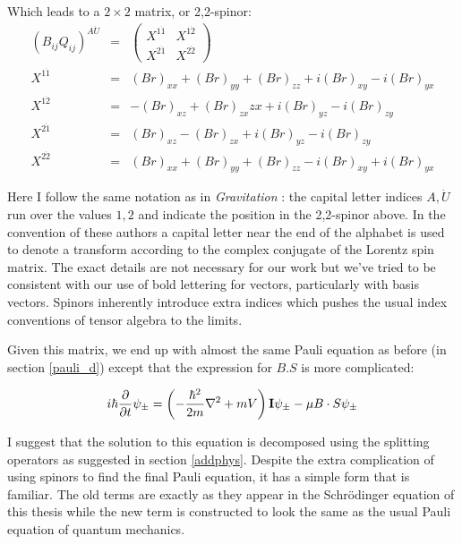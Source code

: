\noindent Which leads to a $2\times 2$ matrix, or 2,2-spinor:
\begin{eqnarray}
(B_{ij} Q_{ij})^{A\dot{U}} &=& 
\left(\begin{array}{cc}
X^{1\dot{1}} & X^{1\dot{2}} \\
X^{2\dot{1}} & X^{2\dot{2}}
\end{array}\right) \\
X^{1\dot{1}} &=& (B r)_{xx} +(B r)_{yy} + (B r)_{zz} + i (B r)_{xy} -i (B r)_{yx} \\
X^{1\dot{2}} &=& -(B r)_{xz} + (B r)_{zx}{zx} + i (B r)_{yz} - i (B r)_{zy} \\
X^{2\dot{1}} &=& (B r)_{xz} -(B r)_{zx} +i (B r)_{yz} - i (B r)_{zy} \\
X^{2\dot{2}} &=& (B r)_{xx} + (B r)_{yy} + (B r)_{zz} - i (B r)_{xy} +i (B r)_{yx}
\end{eqnarray}

\noindent Here I follow the same notation as in {\it Gravitation} \citep{bib_grav}: the capital letter indices $A, \dot{U}$ run over the values $1,2$ and indicate the position in the 2,2-spinor above. In the convention of these authors a capital letter near the end of the alphabet is used to denote a transform according to the complex conjugate of the Lorentz spin matrix. The exact details are not necessary for our work but we've tried to be consistent with our use of bold lettering for vectors, particularly with basis vectors. Spinors inherently introduce extra indices which pushes the usual index conventions of tensor algebra to the limits.

Given this matrix, we end up with almost the same Pauli equation as before (in section \ref{pauli_d}) except that the expression for $B.S$ is more complicated:

\begin{equation}
i\hbar\frac{\partial}{\partial t}\psi_\pm = \left( -\frac{\hbar^2}{2m} \nabla^2 + mV \right) {\bf I} \psi_\pm -\mu B\cdot S \psi_\pm
\end{equation}

\noindent I suggest that the solution to this equation is decomposed using the splitting operators as suggested in section \ref{addphys}. Despite the extra complication of using spinors to find the final Pauli equation, it has a simple form that is familiar. The old terms are exactly as they appear in the Schr\"odinger equation of this thesis while the new term is constructed to look the same as the usual Pauli equation of quantum mechanics.

